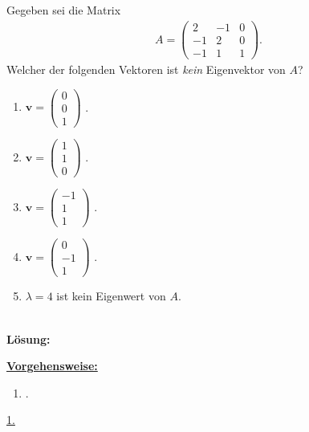 \subsection*{}
Gegeben sei die Matrix
\begin{align*}
	A =
	\begin{pmatrix}
		2 & -1 & 0 \\
		-1 & 2 & 0 \\
		-1 & 1 & 1
	\end{pmatrix}
	.
\end{align*}
Welcher der folgenden Vektoren ist \textit{kein} Eigenvektor von $A$?
\renewcommand{\labelenumi}{(\alph{enumi})}
\begin{enumerate}
	\item 
	$ 
	\mathbf{v}
	=
	\begin{pmatrix}
		0\\ 0 \\ 1
	\end{pmatrix}
	$
	.
	\item 
	$ 
	\mathbf{v}
	=
	\begin{pmatrix}
		1\\ 1 \\ 0
	\end{pmatrix}
	$
	.
	\item
	$ 
	\mathbf{v}
	=
	\begin{pmatrix}
		-1\\ 1 \\ 1
	\end{pmatrix}
	$
	.
	\item
	$ 
	\mathbf{v}
	=
	\begin{pmatrix}
		0\\ -1 \\ 1
	\end{pmatrix}
	$
	.
	\item
	$ \lambda = 4 $ ist kein Eigenwert von $ A $.
\end{enumerate}
\ \\
\textbf{Lösung:}
\begin{mdframed}
\underline{\textbf{Vorgehensweise:}}
\renewcommand{\labelenumi}{\theenumi.}
\begin{enumerate}
\item .
\end{enumerate}
\end{mdframed}

\underline{1. }\\



\newpage

